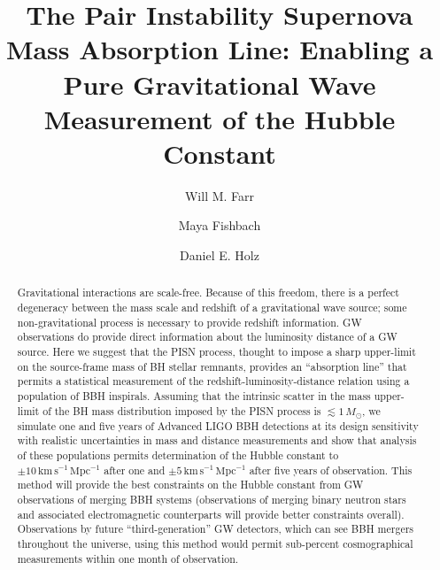 \documentclass[modern]{aastex62}
\newcommand{\fiveYearUncert}{5 \, \kmsMpc}
\newcommand{\oneYearUncert}{10 \, \kmsMpc}
\newcommand{\kmsMpc}{\mathrm{km} \, \mathrm{s}^{-1} \, \mathrm{Mpc}^{-1}}
\newcommand{\MSun}{M_\odot}
\begin{document}
\title{The Pair Instability Supernova Mass Absorption Line: Enabling a Pure
Gravitational Wave Measurement of the Hubble Constant}

\author[0000-0003-1540-8562]{Will M. Farr}

\author[0000-0002-1980-5293]{Maya Fishbach}

\author[0000-0002-0175-5064]{Daniel E. Holz}

\begin{abstract}
%
  Gravitational interactions are scale-free.  Because of this freedom, there is
  a perfect degeneracy between the mass scale and redshift of a gravitational
  wave source; some non-gravitational process is necessary to provide redshift
  information. \Ac{GW} observations do provide direct information about the
  luminosity distance of a \ac{GW} source.  Here we suggest that the \ac{PISN}
  process, thought to impose a sharp upper-limit on the source-frame mass of
  \ac{BH} stellar remnants, provides an ``absorption line'' that permits a
  statistical measurement of the redshift-luminosity-distance relation using a
  population of \ac{BBH} inspirals.  Assuming that the intrinsic scatter in the
  mass upper-limit of the \ac{BH} mass distribution imposed by the \ac{PISN}
  process is $\lesssim 1\,\MSun$, we simulate one and five years of Advanced
  LIGO \ac{BBH} detections at its design sensitivity with realistic
  uncertainties in mass and distance measurements and show that analysis of
  these populations permits determination of the Hubble constant to $\pm
  \oneYearUncert$ after one and $\pm \fiveYearUncert$ after five years of
  observation.  This method will provide the best constraints on the Hubble
  constant from \ac{GW} observations of merging \ac{BBH} systems (observations
  of merging binary neutron stars and associated electromagnetic counterparts
  will provide better constraints overall). Observations by future
  ``third-generation'' \ac{GW} detectors, which can see \ac{BBH} mergers
  throughout the universe, using this method would permit sub-percent
  cosmographical measurements within one month of observation.
%
\end{abstract}
\end{document}
